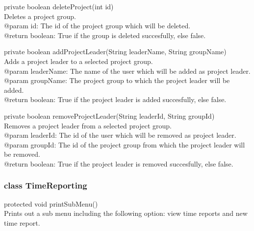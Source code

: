\documentclass[a4paper]{article}
\begin{document}
\vspace{5mm}
\begin{hangparas}{1.5em}{1}
private boolean deleteProject(int id)\\
Deletes a project group.\\
@param id: The id of the project group which will be deleted.\\
@return boolean: True if the group is deleted succesfully, else false.
\end{hangparas}

\vspace{5mm}
\begin{hangparas}{1.5em}{1}
private boolean addProjectLeader(String leaderName, String groupName)\\
Adds a project leader to a selected project group.\\
@param leaderName: The name of the user which will be added as project leader.\\
@param groupName: The project group to which the project leader will be added.\\
@return boolean: True if the project leader is added succesfully, else false.
\end{hangparas}

\vspace{5mm}
\begin{hangparas}{1.5em}{1}
private boolean removeProjectLeader(String leaderId, String groupId)\\
Removes a project leader from a selected project group.\\
@param leaderId: The id of the user which will be removed as project leader.\\
@param groupId: The id of the project group from which the project leader will be removed.\\
@return boolean: True if the project leader is removed succesfully, else false.\\
\end{hangparas}


\subsubsection{class TimeReporting}

\begin{hangparas}{1.5em}{1}
protected void printSubMenu()\\
Prints out a sub menu including the following option: view time reports and new time report.
\end{hangparas}
\end{document}
